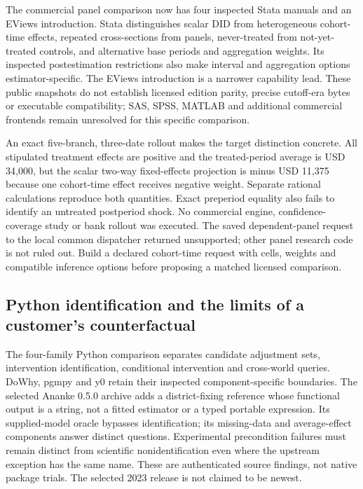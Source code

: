 The commercial panel comparison now has four inspected Stata manuals and
an EViews introduction. Stata distinguishes scalar DID from
heterogeneous cohort-time effects, repeated cross-sections from panels,
never-treated from not-yet-treated controls, and alternative base
periods and aggregation weights. Its inspected postestimation
restrictions also make interval and aggregation options
estimator-specific. The EViews introduction is a narrower capability
lead. These public snapshots do not establish licensed edition parity,
precise cutoff-era bytes or executable compatibility; SAS, SPSS, MATLAB
and additional commercial frontends remain unresolved for this specific
comparison.
\citep{exec18_gp_stata_did,exec18_gp_stata_hdid,exec18_gp_stata_xthdid,
exec18_gp_stata_post,exec18_gp_eviews}

An exact five-branch, three-date rollout makes the target distinction
concrete. All stipulated treatment effects are positive and the
treated-period average is USD 34,000, but the scalar two-way
fixed-effects projection is minus USD 11,375 because one cohort-time
effect receives negative weight. Separate rational calculations
reproduce both quantities. Exact preperiod equality also fails to
identify an untreated postperiod shock. No commercial engine,
confidence-coverage study or bank rollout was executed. The saved
dependent-panel request to the local common dispatcher returned
unsupported; other panel research code is not ruled out. Build a
declared cohort-time request with cells, weights and compatible
inference options before proposing a matched licensed comparison.
\citep{exec18_gp_panel_reference,exec18_gp_dispatch}

\hypertarget{python-identification-and-the-limits-of-a-customers-counterfactual}{%
\subsection{Python identification and the limits of a customer's
counterfactual}\label{python-identification-and-the-limits-of-a-customers-counterfactual}}

The four-family Python comparison separates candidate adjustment sets,
intervention identification, conditional intervention and cross-world
queries. DoWhy, pgmpy and y0 retain their inspected component-specific
boundaries. The selected Ananke 0.5.0 archive adds a district-fixing
reference whose functional output is a string, not a fitted estimator or
a typed portable expression. Its supplied-model oracle bypasses
identification; its missing-data and average-effect components answer
distinct questions. Experimental precondition failures must remain
distinct from scientific nonidentification even where the upstream
exception has the same name. These are authenticated source findings,
not native package trials. The selected 2023 release is not claimed to
be newest.
\citep{exec18_pyid_contract,exec18_pyid_one_line,exec18_pyid_oracle,
exec18_pyid_missing,exec18_pyid_mean}

